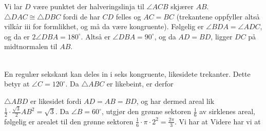 Vi lar $ D $ være punktet der halveringslinja til $ \angle ACB $ skjærer $ AB $. $ \triangle DAC\cong \triangle DBC $ fordi de har $ CD $ felles og $ AC=BC $ (trekantene oppfyller altså vilkår iii for formlikhet, og må da være kongruente). Følgelig er $ \angle BDA=\angle ADC $, og da er $ 2\angle DBA=180^\circ $. Altså er $ \angle DBA=90^\circ $, og da $ AD=BD $, ligger $ DC $ på midtnormalen til $ AB $.
\newpage

 \\
En regulær sekskant kan deles in i seks kongruente, likesidete trekanter. Dette betyr at $ \angle C=120^\circ$. Da $ \triangle ABC $ er likebeint, er derfor

$ \triangle ABD $ er likesidet fordi $ AD=AB=BD $, og har dermed areal lik $ \frac{1}{2}\cdot \frac{\sqrt{3}}{2}AB^2=\sqrt{3} $. Da $ \angle B=60^\circ $, utgjør den grønne sektoren $ \frac{1}{6} $ av sirklenes areal, følgelig er arealet til den grønne sektoren $ \frac{1}{6}\cdot \pi\cdot2^2=\frac{2\pi}{3} $. Vi har at
Videre har vi at

